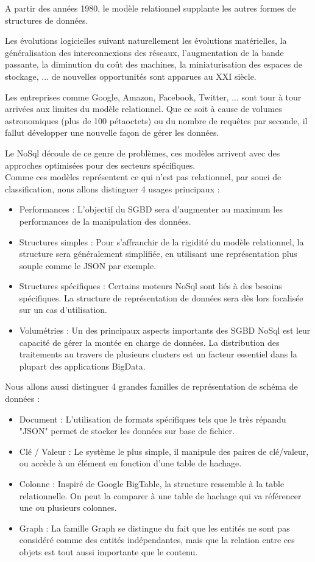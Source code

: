 \documentclass[a4paper,fleqn,12pt]{report}
\begin{document}
A partir des années 1980, le modèle relationnel supplante les autres formes de structures de données.

Les évolutions logicielles suivant naturellement les évolutions matérielles, la généralisation des interconnexions des réseaux, l'augmentation de la bande passante, la diminution du coût des machines, la miniaturisation des espaces de stockage, ... de nouvelles opportunités sont apparues au XXI siècle.

Les entreprises comme Google, Amazon, Facebook, Twitter, ... sont tour à tour arrivées aux limites du modèle relationnel. Que ce soit à cause de volumes astronomiques (plus de 100 pétaoctets) ou du nombre de requêtes par seconde, il fallut développer une nouvelle façon de gérer les données.

Le NoSql découle de ce genre de problèmes, ces modèles arrivent avec des approches optimisées pour des secteurs spécifiques. \\
Comme ces modèles représentent ce qui n'est pas relationnel, par souci de classification, nous allons distinguer 4 usages principaux :

\begin{itemize}
\item Performances : L'objectif du SGBD sera d'augmenter au maximum les performances de la manipulation des données. 
\item Structures simples : Pour s’affranchir de la rigidité du modèle relationnel, la structure sera généralement simplifiée, en utilisant une représentation plus souple comme le JSON par exemple.
\item Structures spécifiques : Certains moteurs NoSql sont liés à des besoins spécifiques. La structure de représentation de données sera dès lors focalisée sur un cas d'utilisation.
\item Volumétries : Un des principaux aspects importants des SGBD NoSql est leur capacité de gérer la montée en charge de données. La distribution des traitements au travers de plusieurs clusters est un facteur essentiel dans la plupart des applications BigData.
\end{itemize} 

Nous allons aussi distinguer 4 grandes familles de représentation de schéma de données :

\begin{itemize}
\item Document : L'utilisation de formats spécifiques tels que le très répandu "JSON" permet de stocker les données sur base de fichier.
\item Clé / Valeur : Le système le plus simple, il manipule des paires de clé/valeur, ou accède à un élément en fonction d'une table de hachage.
\item Colonne : Inspiré de Google BigTable, la structure ressemble à la table relationnelle. On peut la comparer à une table de hachage qui va référencer une ou plusieurs colonnes.
\item Graph : La famille Graph se distingue du fait que les entités ne sont pas considéré comme des entités indépendantes, mais que la relation entre ces objets est tout aussi importante que le contenu.
\end{itemize} 
\end{document}
